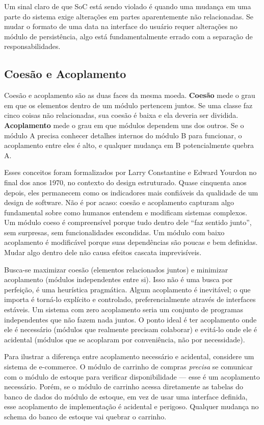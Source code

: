 Um sinal claro de que SoC está sendo violado é quando uma mudança em uma parte
do sistema exige alterações em partes aparentemente não relacionadas. Se mudar o
formato de uma data na interface do usuário requer alterações no módulo de
persistência, algo está fundamentalmente errado com a separação de
responsabilidades.

\subsection{Coesão e Acoplamento}

Coesão e acoplamento são as duas faces da mesma moeda. \textbf{Coesão} mede
o grau em que os elementos dentro de um módulo pertencem juntos. Se uma classe
faz cinco coisas não relacionadas, sua coesão é baixa e ela deveria ser dividida.
\textbf{Acoplamento} mede o grau em que módulos dependem uns dos outros. Se o
módulo A precisa conhecer detalhes internos do módulo B para funcionar, o
acoplamento entre eles é alto, e qualquer mudança em B potencialmente quebra A.

Esses conceitos foram formalizados por Larry Constantine e Edward Yourdon no
final dos anos 1970, no contexto do design estruturado. Quase cinquenta anos
depois, eles permanecem como os indicadores mais confiáveis da qualidade de um
design de software. Não é por acaso: coesão e acoplamento capturam algo
fundamental sobre como humanos entendem e modificam sistemas complexos. Um módulo
coeso é compreensível porque tudo dentro dele ``faz sentido junto'', sem
surpresas, sem funcionalidades escondidas. Um módulo com baixo acoplamento é
modificável porque suas dependências são poucas e bem definidas. Mudar algo
dentro dele não causa efeitos cascata imprevisíveis.

Busca-se maximizar coesão (elementos relacionados juntos) e minimizar
acoplamento (módulos independentes entre si). Isso não é uma busca por perfeição,
é uma heurística pragmática. Algum acoplamento é inevitável; o que importa
é torná-lo explícito e controlado, preferencialmente através de interfaces
estáveis. Um sistema com zero acoplamento seria um conjunto de programas
independentes que não fazem nada juntos. O ponto ideal é ter acoplamento onde
ele é necessário (módulos que realmente precisam colaborar) e evitá-lo onde ele
é acidental (módulos que se acoplaram por conveniência, não por necessidade).

Para ilustrar a diferença entre acoplamento necessário e acidental, considere um
sistema de e-commerce. O módulo de carrinho de compras \textit{precisa} se
comunicar com o módulo de estoque para verificar disponibilidade --- esse é um
acoplamento necessário. Porém, se o módulo de carrinho acessa diretamente as
tabelas do banco de dados do módulo de estoque, em vez de usar uma interface
definida, esse acoplamento de implementação é acidental e perigoso. Qualquer
mudança no schema do banco de estoque vai quebrar o carrinho.

